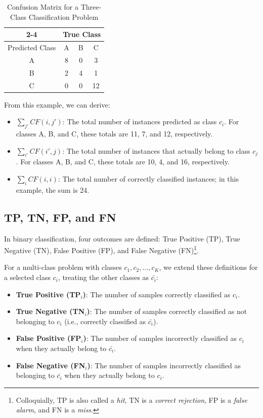 \documentclass[12pt]{article}
\begin{document}
\begin{table}[ht]
\centering
\caption{Confusion Matrix for a Three-Class Classification Problem}
\begin{tabular}{c|c|c|c|}
\cline{2-4}
& \multicolumn{3}{c|}{True Class} \\ \hline
\multicolumn{1}{|c|}{Predicted Class} & A & B & C \\ \hline
\multicolumn{1}{|c|}{A} & 8 & 0 & 3 \\ \hline
\multicolumn{1}{|c|}{B} & 2 & 4 & 1 \\ \hline
\multicolumn{1}{|c|}{C} & 0 & 0 & 12 \\ \hline
\end{tabular}
\end{table}

From this example, we can derive:
\begin{itemize}
    \item \(\sum_{j'} CF(i, j')\): The total number of instances predicted as class \(c_i\). For classes A, B, and C, these totals are 11, 7, and 12, respectively.
    \item \(\sum_{i'} CF(i', j)\): The total number of instances that actually belong to class \(c_j\). For classes A, B, and C, these totals are 10, 4, and 16, respectively.
    \item \(\sum_i CF(i, i)\): The total number of correctly classified instances; in this example, the sum is 24.
\end{itemize}

\subsection{TP, TN, FP, and FN}
In binary classification, four outcomes are defined: True Positive (TP), True Negative (TN), False Positive (FP), and False Negative (FN)\footnote{Colloquially, TP is also called a \textit{hit}, TN is a \textit{correct rejection}, FP is a \textit{false alarm}, and FN is a \textit{miss}.}. 

For a multi-class problem with classes \(c_1, c_2, \dots, c_K\), we extend these definitions for a selected class \(c_i\), treating the other classes as \(\bar{c_i}\):
\begin{itemize}
\item \textbf{True Positive (TP\(_i\))}: The number of samples correctly classified as \(c_i\).
\item \textbf{True Negative (TN\(_i\))}: The number of samples correctly classified as not belonging to \(c_i\) (i.e., correctly classified as \(\bar{c_i}\)).
\item \textbf{False Positive (FP\(_i\))}: The number of samples incorrectly classified as \(c_i\) when they actually belong to \(\bar{c_i}\).
\item \textbf{False Negative (FN\(_i\))}: The number of samples incorrectly classified as belonging to \(\bar{c_i}\) when they actually belong to \(c_i\).
\end{itemize}
\end{document}
